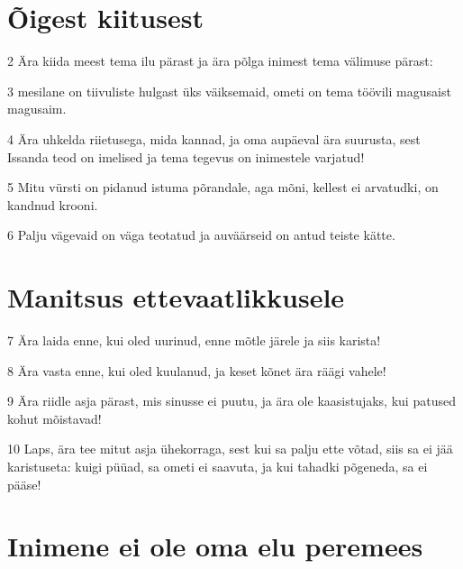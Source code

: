 \section*{Õigest kiitusest}

\par 2 Ära kiida meest tema ilu pärast ja ära põlga inimest tema välimuse pärast:
\par 3 mesilane on tiivuliste hulgast üks väiksemaid, ometi on tema töövili magusaist magusaim.
\par 4 Ära uhkelda riietusega, mida kannad, ja oma aupäeval ära suurusta, sest Issanda teod on imelised ja tema tegevus on inimestele varjatud!
\par 5 Mitu vürsti on pidanud istuma põrandale, aga mõni, kellest ei arvatudki, on kandnud krooni.
\par 6 Palju vägevaid on väga teotatud ja auväärseid on antud teiste kätte.

\section*{Manitsus ettevaatlikkusele}

\par 7 Ära laida enne, kui oled uurinud, enne mõtle järele ja siis karista!
\par 8 Ära vasta enne, kui oled kuulanud, ja keset kõnet ära räägi vahele!
\par 9 Ära riidle asja pärast, mis sinusse ei puutu, ja ära ole kaasistujaks, kui patused kohut mõistavad!
\par 10 Laps, ära tee mitut asja ühekorraga, sest kui sa palju ette võtad, siis sa ei jää karistuseta: kuigi püüad, sa ometi ei saavuta, ja kui tahadki põgeneda, sa ei pääse!

\section*{Inimene ei ole oma elu peremees}

